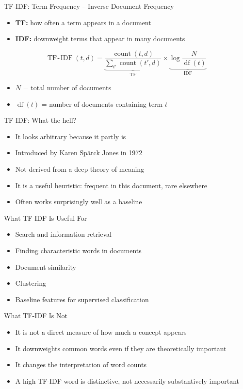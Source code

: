 \documentclass[11pt,aspectratio=43]{beamer}
\begin{document}
\begin{frame}{TF-IDF: Term Frequency -- Inverse Document Frequency}
\begin{itemize}
\item \textbf{TF:} how often a term appears in a document
\item \textbf{IDF:} downweight terms that appear in many documents
\end{itemize}
\[
\operatorname{TF\!-\!IDF}(t,d)=
\underbrace{\frac{\operatorname{count}(t,d)}
{\sum_{t'}\operatorname{count}(t',d)}}_{\mathrm{TF}}
\times
\underbrace{\log\frac{N}{\operatorname{df}(t)}}_{\mathrm{IDF}}
\]
\begin{itemize}
\item $N$ = total number of documents
\item $\operatorname{df}(t)$ = number of documents containing term $t$
\end{itemize}
\end{frame}

\begin{frame}{TF-IDF: What the hell?}
\begin{itemize}
\item It looks arbitrary because it partly is
\pause
\item Introduced by Karen Spärck Jones in 1972
\pause
\item Not derived from a deep theory of meaning
\pause
\item It is a useful heuristic: frequent in this document, rare elsewhere
\pause
\item Often works surprisingly well as a baseline
\end{itemize}
\end{frame}

\begin{frame}{What TF-IDF Is Useful For}
\begin{itemize}
\item Search and information retrieval
\item Finding characteristic words in documents
\item Document similarity
\item Clustering
\item Baseline features for supervised classification
\end{itemize}
\end{frame}

\begin{frame}{What TF-IDF Is Not}
\begin{itemize}
\item It is not a direct measure of how much a concept appears
\item It downweights common words even if they are theoretically important
\item It changes the interpretation of word counts
\item A high TF-IDF word is distinctive, not necessarily substantively important
\end{itemize}
\end{frame}
\end{document}
